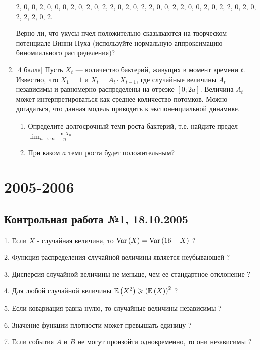 \documentclass[12pt, a4paper]{article}\usepackage[]{graphicx}\usepackage[]{color}
\begin{document}
\begin{enumerate}
2, 0, 0, 2, 0, 0, 0, 2, 0, 2, 0, 2, 2, 0, 2, 0, 2, 2, 0, 0, 2, 2, 0, 0, 2, 0, 2, 2, 0, 2, 0, 2, 2, 2, 0, 2.

Верно ли, что укусы пчел положительно сказываются на творческом потенциале Винни-Пуха
(используйте нормальную аппроксимацию биномиального распределения)?
\item $[$4 балла] Пусть $X_t$ — количество бактерий, живущих в момент времени $t$. Известно, что $X_1 =1$ и $X_t = A_t \cdot X_{t-1}$, где случайные величины $A_t$ независимы и равномерно
распределены на отрезке $[0; 2a]$. Величина $A_t$ может интерпретироваться как среднее
количество потомков. Можно догадаться, что данная модель приводить к экспоненциальной динамике.
\begin{enumerate}
\item Определите долгосрочный темп роста бактерий, т.е. найдите предел $\lim_{n\to\infty}\frac{\ln X_n}{n}$
\item При каком $a$ темп роста будет положительным?
\end{enumerate}


\end{enumerate}



\section{2005-2006}





\subsection{Контрольная работа №1, 18.10.2005}

1. Если  $X$  - случайная величина, то  $\operatorname{Var}\left(X\right)=\operatorname{Var}\left(16-X\right)$  ?

2. Функция распределения случайной величины является неубывающей ?

3. Дисперсия случайной величины не меньше, чем ее стандартное отклонение ?

4. Для любой случайной величины  $\mathbb{E}\left(X^{2} \right)\geqslant \left(\mathbb{E}\left(X\right)\right)^{2} $  ?

5. Если ковариация равна нулю, то случайные величины независимы ?

6. Значение функции плотности может превышать единицу ?

7. Если события  $A$  и  $B$  не могут произойти одновременно, то они независимы ?
\end{document}
